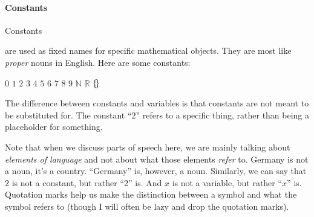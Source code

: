 \documentclass[12pt]{article}
\def\N{\mathbb{N}}
\def\R{\mathbb{R}}
\renewcommand{\emptyset}{\{\hspace{-2pt}\}}
\begin{document}
\paragraph{Constants}
\hypertarget{hl:constants}{Constants} are used as fixed names for specific mathematical objects.
They are most like \emph{proper} nouns in English.
Here are some constants:
\begin{center}
$0$ \sp $1$ \sp $2$ \sp $3$ \sp $4$ \sp $5$ \sp $6$ \sp $7$ \sp $8$ \sp $9$ \sp $\N$ \sp $\R$ \sp $\emptyset$
\end{center}
The difference between constants and variables is that constants are not meant to be substituted for.
The constant ``$2$'' refers to a specific thing, rather than being a placeholder for something.


Note that when we discuss parts of speech here, we are mainly talking about \emph{elements of language} and not about what those elements \emph{refer} to.
Germany is not a noun, it's a country. ``Germany'' is, however, a noun.
Similarly, we can say that $2$ is not a constant, but rather ``$2$'' is.
And $x$ is not a variable, but rather ``$x$'' is.
Quotation marks help us make the distinction between a symbol and what the symbol refers to
(though I will often be lazy and drop the quotation marks).




\def\sp{\hspace{1em}}
\end{document}

